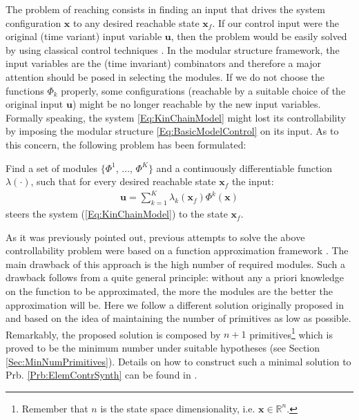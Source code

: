 \documentclass{svmult}
\newcommand{\x}{\mathbf {x}}
\begin{document}
The problem of reaching consists in finding an input that drives the
system configuration $\mathbf x$ to any desired reachable state $\mathbf x_f$. If
our control input were the original (time variant) input variable $\mathbf u$, then
the problem would be easily solved by using classical control techniques
\cite{MurrayLeeSastry}. In the modular structure framework, the input
variables are the (time invariant) combinators and therefore a major attention 
should be posed in selecting the modules. If we do not choose the functions
$\Phi_k$ properly, some configurations (reachable by a suitable
choice of the original input $\mathbf u$) might be no longer reachable 
by the new input variables. Formally speaking, the system 
\eqref{Eq:KinChainModel} might lost its controllability by imposing
the modular structure \eqref{Eq:BasicModelControl} on its input.
As to this concern, the following problem has been formulated:

\begin{problem} \label{Prb:ElemContrSynth}
Find a set of modules $\{\Phi^1$, $\dots$,
$\Phi^K\}$ and a continuously differentiable function
$\lambda(\cdot)$, such that for every desired reachable state 
$\mathbf x_f$ the input:
\begin{eqnarray} \label{Eq:CombinedInput}
\mathbf u = \sum_{k=1}^K \lambda_k(\mathbf x_f) \Phi^k(\mathbf x)
\end{eqnarray}
steers the system (\ref{Eq:KinChainModel}) to the state $\mathbf x_f$.
\end{problem}

As it was previously pointed out, previous attempts to solve 
the above controllability problem were based on a function 
approximation framework \cite{WolpertKawato1998,MussaIvaldi1992BiolCyb}.
The main drawback of this approach is the high number of required modules.
Such a drawback follows from a quite general principle: without any a priori knowledge on
the function to be approximated, the more the modules are the better 
the approximation will be. Here we follow a different solution 
originally proposed in \cite{NoriFrezzaNolcos04} and based on the
idea of maintaining the number of primitives as low as possible.
Remarkably, the proposed solution is composed by $n+1$ primitives\footnote{
Remember that $n$ is the state space dimensionality, i.e. $\x \in \mathbb R^n$.}
which is proved to be the minimum number under suitable hypotheses 
(see Section \ref{Sec:MinNumPrimitives}). Details on how to 
construct such a minimal solution to Prb. \ref{Prb:ElemContrSynth}
can be found in \cite{NoriBiolCyb2005}.
\end{document}
